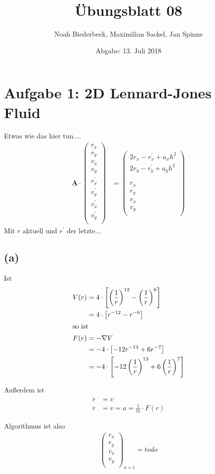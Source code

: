\documentclass{scrartcl}
\title{Übungsblatt 08}
\author{%
		Noah Biederbeck, Maximilian Sackel, Jan Spinne
}
\date{Abgabe: 13. Juli 2018}
\begin{document}
\maketitle
\section*{Aufgabe 1: 2D Lennard-Jones Fluid}
Etwas wie das hier tun....
\begin{align*}
  \mathbf{\underline{A}} \cdot
  \left(\begin{matrix}
      r_x \\
      r_y \\
      v_x \\
      v_y \\
      r_x^{'} \\
      r_y^{'} \\
      v_x^{'} \\
      v_y^{'} \\
  \end{matrix}\right)
  &=
  \left(\begin{matrix}
      2 r_x - r_x^{'} + a_x h^2 \\
      2 r_y - r_y^{'} + a_y h^2 \\
      \\
      \\
      r_x \\
      r_y \\
      v_x \\
      v_y \\
  \end{matrix}\right)
\end{align*}
Mit $r$ aktuell und $r^{'}$ der letzte...


\subsection*{(a)}

Ist
\begin{align*}
  V(r) &= 4 \cdot \left[\left(\frac{1}{r}\right)^{12} - \left(\frac{1}{r}\right)^{6}\right] \\
       &= 4 \cdot \left[{r}^{-12} - {r}^{-6}\right] \\
  \intertext{so ist}
  F(r) &= - \nabla V \\
       &= - 4 \cdot \left[-12 {r}^{-13} + 6 {r}^{-7}\right] \\
       &= - 4 \cdot \left[- 12 \left(\frac{1}{r}\right)^{13} + 6 \left(\frac{1}{r}\right)^{7}\right] \\
\end{align*}

Außerdem ist
\begin{align*}
  \dot{r} &= v \\
  \ddot{r} &= \dot{v} = a = \frac{1}{m} \cdot F(r)
\end{align*}

Algorithmus ist also
\begin{align*}
  \left(\begin{matrix} r_x \\ r_y \\ v_x \\ v_y \\ \end{matrix}\right)_{n+1} = todo
\end{align*}
\end{document}
